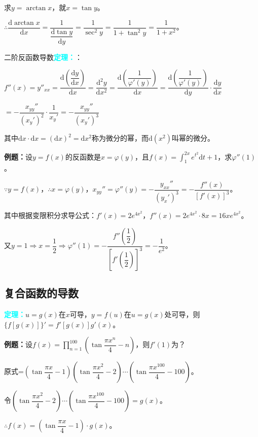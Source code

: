 \documentclass[UTF8, 12pt]{ctexart}
\begin{document}
求$y=\arctan x$，就$x=\tan y$。\medskip

$\therefore\dfrac{\textrm{d}\arctan x}{\textrm{d}x}=\dfrac{1}{\dfrac{\textrm{d}\tan y}{\textrm{d}y}}=\dfrac{1}{\sec^2y}=\dfrac{1}{1+\tan^2y}=\dfrac{1}{1+x^2}$。\medskip

二阶反函数导数\textcolor{aqua}{\textbf{定理：}}：\medskip

$f''(x)=y''_{xx}=\dfrac{\textrm{d}\left(\dfrac{\textrm{d}y}{\textrm{d}x}\right)}{\textrm{d}x}=\dfrac{\textrm{d}^2y}{\textrm{d}x^2}=\dfrac{\textrm{d}\left(\dfrac{1}{\varphi'(y)}\right)}{\textrm{d}x}=\dfrac{\textrm{d}\left(\dfrac{1}{\varphi'(y)}\right)}{\textrm{d}y}\cdot\dfrac{\textrm{d}y}{\textrm{d}x}$

$=-\dfrac{x_{yy}''}{(x_y')^2}\cdot\dfrac{1}{x_y'}=-\dfrac{x_{yy}''}{(x_y')^3}$\medskip

其中$\textrm{d}x\cdot\textrm{d}x=(\textrm{d}x)^2=\textrm{d}x^2$称为微分的幂，而$\textrm{d}(x^2)$叫幂的微分。

\textbf{例题：}设$y=f(x)$的反函数是$x=\varphi(y)$，且$f(x)=\int_1^{2x}e^{t^2}\textrm{d}t+1$，求$\varphi''(1)$。

$\because y=f(x)$，$\therefore x=\varphi(y)$，$x_{yy}''=\varphi''(y)=-\dfrac{y_{xx}''}{(y_x')^3}=-\dfrac{f''(x)}{[f'(x)]^3}$。\medskip

其中根据变限积分求导公式：$f'(x)=2e^{4x^2}$，$f''(x)=2e^{4x^2}\cdot 8x=16xe^{4x^2}$。\medskip

又$y=1\Rightarrow x=\dfrac{1}{2}\Rightarrow\varphi''(1)=-\dfrac{f''\left(\dfrac{1}{2}\right)}{\left[f'\left(\dfrac{1}{2}\right)\right]^3}=-\dfrac{1}{e^2}$。

\subsection{复合函数的导数}

\textcolor{aqua}{\textbf{定理：}}$u=g(x)$在$x$可导，$y=f(u)$在$u=g(x)$处可导，则$\{f[g(x)]\}'=f'[g(x)]g'(x)$。

\textbf{例题：}设$f(x)=\prod\limits_{n=1}^{100}\left(\tan\dfrac{\pi x^n}{4}-n\right)$，则$f'(1)$为？

原式=$\left(\tan\dfrac{\pi x}{4}-1\right)\left(\tan\dfrac{\pi x^2}{4}-2\right)\cdots\left(\tan\dfrac{\pi x^{100}}{4}-100\right)$。

令$\left(\tan\dfrac{\pi x^2}{4}-2\right)\cdots\left(\tan\dfrac{\pi x^{100}}{4}-100\right)=g(x)$。\medskip

$\therefore f(x)=\left(\tan\dfrac{\pi x}{4}-1\right)\cdot g(x)$。\medskip
\end{document}
